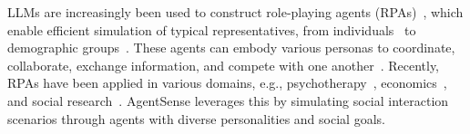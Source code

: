 LLMs are increasingly been used to construct role-playing agents (RPAs)~\cite{chen2024personapersonalizationsurveyroleplaying}, which enable efficient simulation of typical representatives, from individuals~\cite{shao2023characterllmtrainableagentroleplaying,argyle2023out} to demographic groups~\cite{li2023camel,jiang2024evaluating}.
These agents can embody various personas to coordinate, collaborate, exchange information, and compete with one another~\cite{chen2024personapersonalizationsurveyroleplaying, zhou2024sotopiainteractiveevaluationsocial}.
Recently, RPAs have been applied in various domains, e.g., psychotherapy~\cite{article}, economics~\cite{fu2023improvinglanguagemodelnegotiation}, and social research~\cite{doi:10.1126/science.adi1778}.
AgentSense leverages this by simulating social interaction scenarios through agents with diverse personalities and social goals.